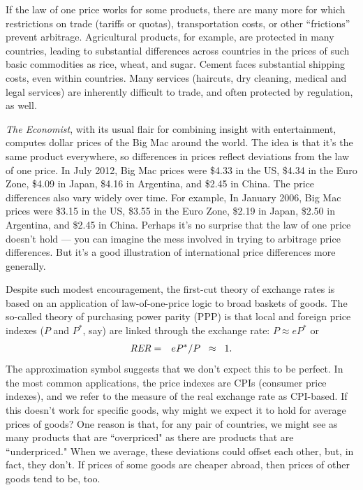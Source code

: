 If the law of one price works for some products,
there are many more for which restrictions on
trade (tariffs or quotas), transportation costs,
or other ``frictions'' prevent arbitrage.
Agricultural products, for example, are protected in many countries,
leading to substantial differences across countries
in the prices of such basic commodities as rice, wheat, and sugar.
Cement faces substantial shipping costs, even within countries.
Many services (haircuts, dry cleaning, medical and legal services)
are inherently difficult to trade,
and often protected by regulation, as well.

{\it The Economist\/}, with its usual flair for combining insight
with entertainment, computes dollar prices of the Big Mac around the
world.
The idea is that it's the same product everywhere, so differences
in prices reflect deviations from the law of one price.
In July 2012, Big Mac prices were \$4.33 in the US,
\$4.34 in the Euro Zone, \$4.09 in Japan, \$4.16 in Argentina,
and \$2.45 in China. The price differences also vary
widely over time. For example, In January 2006, Big Mac prices  were \$3.15 in the US,
\$3.55 in the Euro Zone, \$2.19 in Japan, \$2.50 in Argentina,
and \$2.45 in China. Perhaps it's no surprise that the law of one price doesn't hold --- you can imagine the mess involved in trying to arbitrage price
differences.
But it's a good illustration of international price differences
more generally.


Despite such modest encouragement,
the first-cut theory of exchange rates is based on an application of
law-of-one-price logic to broad baskets of goods.
The so-called theory of purchasing power parity (PPP)
is that local and foreign price indexes ($P$ and $P^*$, say)
are linked through the exchange rate:  $ P \approx e P^* $ or
\begin{eqnarray}
    \mbox{\it RER\/} &=& eP^* /P \;\;\approx\;\; 1.
    \label{eq:ppp}
\end{eqnarray}
The approximation symbol suggests that we don't expect this to be perfect.
In the most common applications, the price indexes are CPIs
(consumer price indexes),
and we refer to the measure of the real exchange rate as CPI-based.
If this doesn't work for specific goods, why might we expect it to hold
for average prices of goods?
One reason is that, for any pair of countries,
we might see as many products that are ``overpriced"
as there are products that are ``underpriced."
When we average, these deviations could offset each other, but,
in fact, they don't.
If prices of some goods are cheaper abroad, then prices
of other goods tend to be, too.

